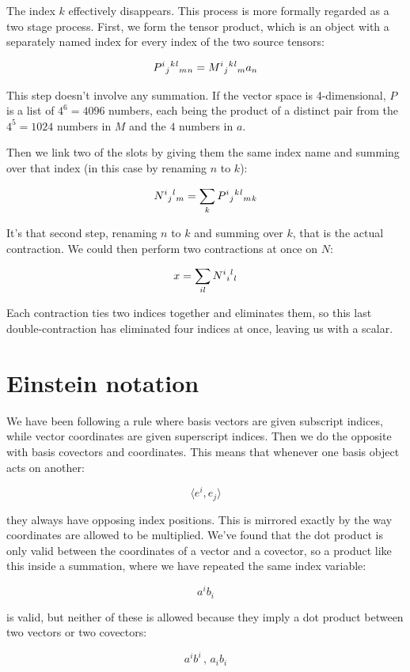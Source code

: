 The index $k$ effectively disappears. This process is more formally regarded as a two stage process. First, we form the tensor product, which is an object with a separately named index for every index of the two source tensors:

$$
P\indices{^i_j^k^l_m_n} = M\indices{^i_j^k^l_m} a_n
$$

This step doesn't involve any summation. If the vector space is 4-dimensional, $P$ is a list of $4^6 = 4096$ numbers, each being the product of a distinct pair from the $4^5 = 1024$ numbers in $M$ and the $4$ numbers in $a$.

Then we link two of the slots by giving them the same index name and summing over that index (in this case by renaming $n$ to $k$):

$$
N\indices{^i_j^l_m} = \sum_{k} P\indices{^i_j^k^l_m_k}
$$

It's that second step, renaming $n$ to $k$ and summing over $k$, that is the actual contraction. We could then perform two contractions at once on $N$:

$$
x = \sum_{il} N\indices{^i_i^l_l}
$$

Each contraction ties two indices together and eliminates them, so this last double-contraction has eliminated four indices at once, leaving us with a scalar.

\section{Einstein notation}

We have been following a rule where basis vectors are given subscript indices, while vector coordinates are given superscript indices. Then we do the opposite with basis covectors and coordinates. This means that whenever one basis object acts on another:

$$
\langle e^i, e_j \rangle
$$

they always have opposing index positions. This is mirrored exactly by the way coordinates are allowed to be multiplied. We've found that the dot product is only valid between the coordinates of a vector and a covector, so a product like this inside a summation, where we have repeated the same index variable:

$$
a^i b_i
$$

is valid, but neither of these is allowed because they imply a dot product between two vectors or two covectors:

$$
a^i b^i \, , \, a_i b_i
$$

